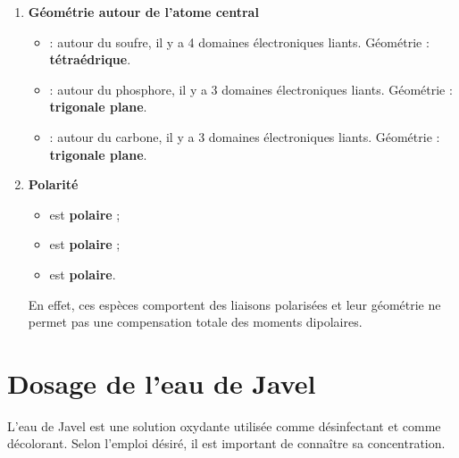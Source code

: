 \documentclass[a4paper,fontsize=11pt,fleqn]{scrartcl}
\begin{document}
\begin{enumerate}
    \item \textbf{Géométrie autour de l'atome central}

    \begin{itemize}
        \item \textbf{} : autour du soufre, il y a 4 domaines électroniques liants.  
        Géométrie : \textbf{tétraédrique}.

        \item \textbf{} : autour du phosphore, il y a 3 domaines électroniques liants.  
        Géométrie : \textbf{trigonale plane}.

        \item \textbf{} : autour du carbone, il y a 3 domaines électroniques liants.  
        Géométrie : \textbf{trigonale plane}.
    \end{itemize}

    \item \textbf{Polarité}

    \begin{itemize}
        \item {} est \textbf{polaire} ;
        \item {} est \textbf{polaire} ;
        \item {} est \textbf{polaire}.
    \end{itemize}

    En effet, ces espèces comportent des liaisons polarisées et leur géométrie ne permet pas une compensation totale des moments dipolaires.
\end{enumerate}

\newpage

\section{Dosage de l'eau de Javel}

L'eau de Javel est une solution oxydante utilisée comme désinfectant et comme décolorant. Selon l'emploi désiré, il est important de connaître sa concentration.
\end{document}
